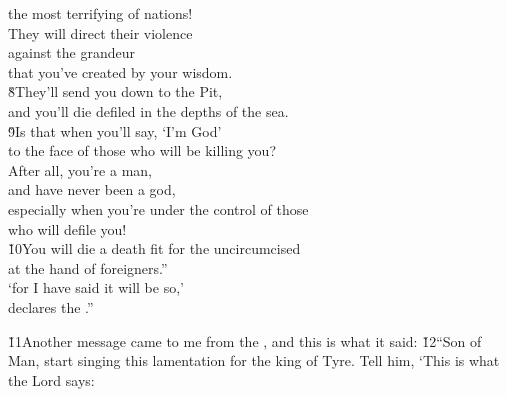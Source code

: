 \begin{poetry}
\poemlll       the most terrifying of nations! \\
\poeml They will direct their violence \\
\poemll    against the grandeur \\
\poemlll       that you've created by your wisdom. \\
\poeml \v{8}They'll send you down to the Pit, \\
\poemll    and you'll die defiled in the depths of the sea. \\
\poeml \v{9}Is that when you'll say, `I'm God' \\
\poemll    to the face of those who will be killing you? \\
\poeml After all, you're a man, \\
\poemll    and have never been a god, \\
\poeml especially when you're under the control of those \\
\poemll    who will defile you! \\
\poeml \v{10}You will die a death fit for the uncircumcised \\
\poemll    at the hand of foreigners.'' \\
\poeml `for I have said it will be so,' \\
\poemll    declares the .''
\end{poetry}

\v{11}Another message came to me from the , and this is what it said: \v{12}``Son of Man, start singing this lamentation for the king of Tyre. Tell him, `This is what the Lord  says:

